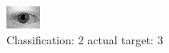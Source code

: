 \begin{figure}[h!]
\begin{center}
\includegraphics[width=0.60\columnwidth]{figures/ID627_class_2_target_3.png}
\end{center}
\caption{ Classification: 2 actual target: 3}
\label{fig:ID627_class_2_target_3}
\end{figure}

